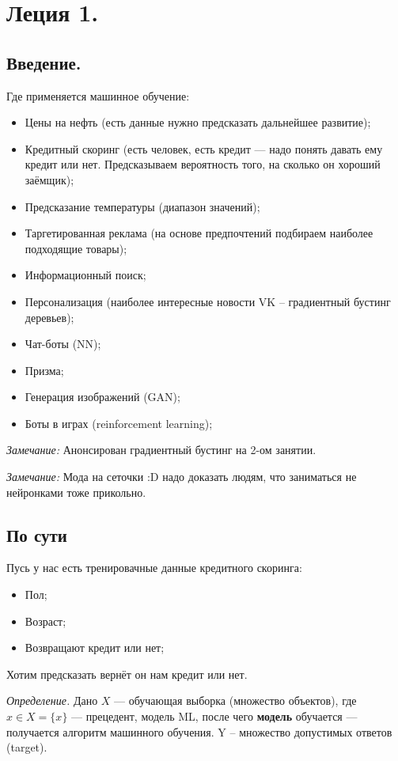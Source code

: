 \documentclass[a4paper,14pt]{article}
\begin{document}
\section{Леция 1.}
\subsection {Введение.}
Где применяется машинное обучение:
\begin{itemize}
    \item Цены на нефть (есть данные нужно предсказать дальнейшее развитие);
    \item Кредитный скоринг (есть человек, есть кредит --- надо понять давать ему кредит или нет. Предсказываем вероятность того, на сколько он хороший заёмщик);
    \item Предсказание температуры (диапазон значений);
    \item Таргетированная реклама (на основе предпочтений подбираем наиболее подходящие товары);
    \item Информационный поиск;
    \item Персонализация (наиболее интересные новости VK -- градиентный бустинг деревьев);
    \item Чат-боты (NN);
    \item Призма;
    \item Генерация изображений (GAN); 
    \item Боты в играх (reinforcement learning);
\end{itemize}

{\it Замечание:} Анонсирован градиентный бустинг на 2-ом занятии.

{\it Замечание:} Мода на сеточки :D надо доказать людям, что заниматься не нейронками тоже прикольно.


\subsection{По сути}

Пусь у нас есть тренировачные данные кредитного скоринга:
\begin{itemize}
    \item Пол;
    \item Возраст;
    \item Возвращают кредит или нет;
\end{itemize} 

Хотим предсказать вернёт он нам кредит или нет.

{\it Определение.} Дано $X$ --- обучающая выборка (множество объектов), где $x \in X = \{x\}$ --- прецедент, модель ML, после чего {\bf модель} обучается --- получается алгоритм машинного обучения. Y -- множество допустимых ответов (target).
\end{document}
